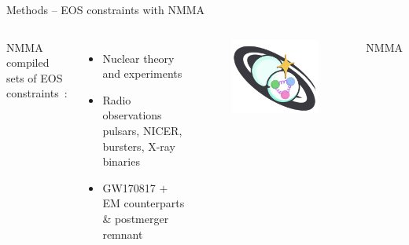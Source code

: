 \documentclass[usenames,dvipsnames,t]{beamer}
\begin{document}
\begin{frame}{Methods -- EOS constraints with \textsc{NMMA}}

\def\x{2mm}
\def\y{2mm}
\def\z{-2mm}

\vspace{\z}

\begin{columns}

  \textsc{NMMA}~\cite{Pang:2022rzc} compiled sets of EOS constraints~\cite{Koehn:2024set}:
  \footnotesize
  \begin{itemize}

    \item Nuclear theory and experiments
    \item Radio observations pulsars, NICER, bursters, X-ray binaries
    \item GW170817 $+$ EM counterparts \& postmerger remnant

  \end{itemize}
  \normalsize


  \begin{figure}[t]
    \centering
    \includegraphics[width=\linewidth]{Figures/NMMA logo.jpg}
  \end{figure}

  \vspace{-3mm}
  \small \textsc{NMMA} \normalsize
  
\end{columns}


\end{frame}
\end{document}
